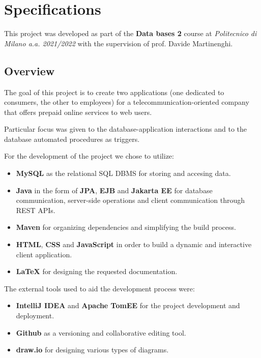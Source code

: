 
\chapter{Specifications}

This project was developed as part of the \textbf{Data bases 2} course at \textit{Politecnico di Milano a.a. 2021/2022} with the supervision of prof. Davide Martinenghi.


\section{Overview}
\label{sec:overview}

The goal of this project is to create two applications (one dedicated to consumers, the other to employees) for a telecommunication-oriented company that offers prepaid online services to web users. 

Particular focus was given to the database-application interactions and to the database automated procedures as triggers. 

For the development of the project we chose to utilize:
\begin{itemize}
    \item \textbf{MySQL} as the relational SQL DBMS for storing and accesing data. 
    \item \textbf{Java} in the form of \textbf{JPA}, \textbf{EJB} and \textbf{Jakarta EE} for database communication, server-side operations and client communication through REST APIs.
    \item \textbf{Maven} for organizing dependencies and simplifying the build process.
    \item \textbf{HTML}, \textbf{CSS} and \textbf{JavaScript} in order to build a dynamic and interactive client application.
    \item \textbf{\LaTeX} for designing the requested documentation.
\end{itemize}

The external tools used to aid the development process were:
\begin{itemize}
    \item \textbf{IntelliJ IDEA} and \textbf{Apache TomEE} for the project development and deployment.
    \item \textbf{Github} as a versioning and collaborative editing tool.
    \item \textbf{draw.io} for designing various types of diagrams.
\end{itemize}

